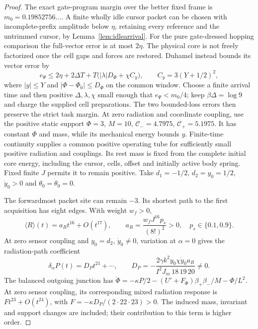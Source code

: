 \documentclass[12pt]{article}
\theoremstyle{definition}
\theoremstyle{remark}
\begin{document}
\begin{proof}
The exact gate-program margin over the better fixed frame is
$m_0=0.19852756\ldots$. A finite wholly idle cursor packet can be
chosen with incomplete-prefix amplitude below $\eta$, retaining
every reference and the untrimmed cursor, by
Lemma~\ref{lem:idlearrival}. For the pure gate-dressed hopping
comparison the full-vector error is at most $2\eta$.
The physical core is not freely factorized once the cell gaps and
forces are restored. Duhamel instead bounds its vector error by
\[
 e_\Psi\le2\eta+2\Delta T+
 T\bigl(|\lambda|D_\Phi+\chi C_y\bigr),\qquad
 C_y=3(Y+1/2)^2,
\]
where $|y|\le Y$ and $|\Phi-\Phi_0|\le D_\Phi$ on the common
window. Choose a finite arrival time and then positive
$\Delta,\lambda,\chi$ small enough that $e_\Psi<m_0/4$;
keep $\beta\Delta=\log9$ and charge the supplied cell preparations.
The two bounded-loss errors then preserve the strict task margin.
At zero radiation and coordinate coupling, use the positive static
support $\Phi=3$, $M=10$, $\mathcal C_-=4.7975$,
$\mathcal C_+=5.1975$. It has constant $\Phi$ and mass,
while its mechanical energy bounds
$y$. Finite-time continuity supplies a common positive operating
tube for sufficiently small positive radiation and couplings.
Its rest mass is fixed from the complete initial core energy, including
the cursor, cells, offset and initially active body spring. Fixed finite
$J$ permits it to remain positive. Take $d_1=-1/2$, $d_2=y_0=1/2$,
$\dot y_0>0$ and $\theta_0=\dot\theta_0=0$.

The forwardmost packet site can remain $-3$. Its shortest path
to the first acquisition has eight edges. With weight $w_f>0$,
\[
 \langle R\rangle(t)=a_Rt^{16}+O(t^{17}),\qquad
 a_R=\frac{w_fJ^{16}p_s}{(8!)^2}>0,
 \quad p_s\in\{0.1,0.9\}.
\]
At zero sensor coupling and $y_0=d_2$, $\dot y_0\ne0$, variation
at $\alpha=0$ gives the radiation-path coefficient
\[
 \delta_\alpha P(t)=D_Pt^{21}+\cdots,\qquad
 D_P=-\frac{2\gamma k^2y_0\chi\dot y_0a_R}
 {I^2J_m\,18\,19\,20}\ne0.
\]
The balanced outgoing junction has
$\ddot\Phi=-\kappa P/2-(U'+F_\Phi)\beta_+\beta_-/M-\Phi/L^2$.
At zero sensor coupling, its corresponding mixed radiation
response is $Ft^{23}+O(t^{24})$, with
$F=-\kappa D_P/(2\cdot22\cdot23)>0$.
The induced mass, invariant and support changes are included;
their contribution to this term is higher order.


\end{proof}
\end{document}
